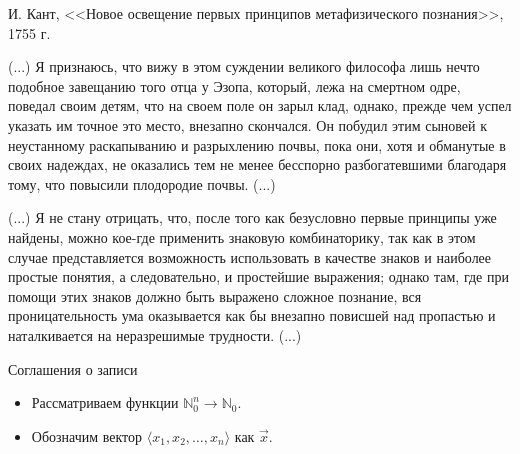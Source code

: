 \documentclass[aspectratio=169]{beamer}
\begin{document}
\begin{frame}{И. Кант, <<Новое освещение первых принципов метафизического познания>>, 1755 г.}

(...) Я признаюсь, что вижу в этом суждении великого
философа лишь нечто подобное завещанию того отца у
Эзопа, который, лежа на смертном одре, поведал своим
детям, что на своем поле он зарыл клад, однако, прежде
чем успел указать им точное это место, внезапно 
скончался. Он побудил этим сыновей к неустанному раскапыванию и разрыхлению почвы,
пока они, хотя и обманутые в своих надеждах, не оказались тем не менее бесспорно
разбогатевшими благодаря тому, что повысили плодородие почвы. (...)\vspace{0.2cm}

(...) Я не стану отрицать,
что, после того как безусловно первые принципы уже 
найдены, можно кое-где применить знаковую 
комбинаторику, так как в этом случае представляется возможность 
использовать в качестве знаков и наиболее простые понятия,
а следовательно, и простейшие выражения;
однако там, где при помощи этих знаков должно быть выражено сложное
познание, вся проницательность ума оказывается как бы внезапно
повисшей над пропастью и наталкивается на неразрешимые трудности. (...)
\end{frame}

\begin{frame}{Соглашения о записи}
\begin{itemize}
\item Рассматриваем функции $\mathbb{N}^n_0\to\mathbb{N}_0$.
\item Обозначим вектор $\langle x_1, x_2, \dots, x_n\rangle$ как $\overrightarrow{x}$.
\end{itemize}
\end{frame}
\end{document}
